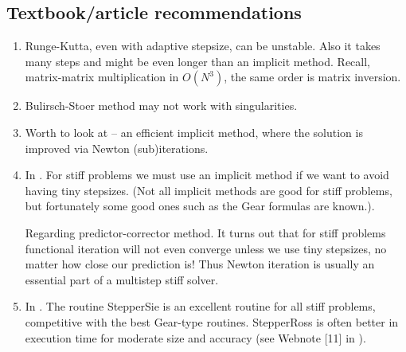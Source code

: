 \documentclass[]{article}
\begin{document}
\subsection{Textbook/article recommendations}
\begin{enumerate}
\item Runge-Kutta, even with adaptive stepsize, can be unstable. Also it takes many steps and might be even longer than an implicit method. Recall, matrix-matrix multiplication in $O(N^3)$, the same order is matrix inversion.
\item Bulirsch-Stoer method may not work with singularities.
\item Worth to look at \cite{Benner04, Benner08} -- an efficient implicit method, where the solution is improved via Newton (sub)iterations.
\item In \cite{NR07}. For stiff problems we must use an implicit method if we want to avoid having
tiny stepsizes. (Not all implicit methods are good for stiff problems, but fortunately
some good ones such as the Gear formulas are known.).

Regarding predictor-corrector method. It turns out that for stiff problems functional iteration
will not even converge unless we use tiny stepsizes, no matter how close our prediction is! Thus Newton iteration is usually an essential part of a multistep stiff solver.
\item In \cite{NR07}. The routine StepperSie is an excellent routine for all stiff problems, competitive with the best Gear-type routines. StepperRoss is often better in execution time for moderate size and accuracy (see Webnote [11] in \cite{NR07}).
\end{enumerate} 
\end{document}
